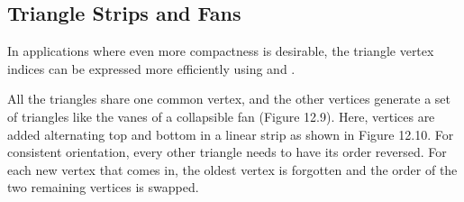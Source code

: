 \documentclass[11pt]{article}
\numberwithin{equation}{section}
\begin{document}
\subsection{Triangle Strips and Fans}
In applications where even more compactness is desirable, the triangle vertex indices can be expressed more efficiently using  and .

All the triangles share one common vertex, and the other vertices generate a set of triangles like the vanes of a collapsible fan (Figure 12.9). 
Here, vertices are added alternating top and bottom in a linear strip as shown in Figure 12.10.  For consistent orientation, every other triangle needs to have its order reversed. For each new vertex that comes in, the oldest vertex is forgotten and the order of the two remaining vertices is swapped.
\end{document}
